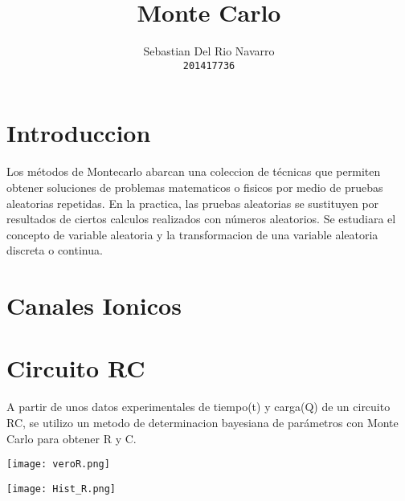 \documentclass[twoside]{article}
\title{\vspace{-15mm}\fontsize{20pt}{12pt}\selectfont\textbf{ Monte Carlo}}
\author{
  Sebastian Del Rio Navarro\\
  \texttt{201417736}\\
  }
\begin{document}
\maketitle %






\section{Introduccion}


Los métodos de Montecarlo abarcan una coleccion de técnicas que permiten obtener soluciones de problemas matematicos o fisicos por medio de pruebas aleatorias repetidas. En la practica, las pruebas aleatorias se sustituyen por resultados de ciertos calculos realizados con números aleatorios. Se estudiara el concepto de variable aleatoria y la transformacion de una variable aleatoria discreta o continua.



\section{Canales Ionicos}


\pagebreak

\section{Circuito RC}

A partir de unos datos experimentales de tiempo(t) y carga(Q) de un circuito RC, se utilizo un metodo de determinacion bayesiana de parámetros con Monte Carlo para obtener R y C.

\begin{centering}
\texttt{[image: veroR.png]}
\end{centering}

\begin{centering}
\texttt{[image: Hist\_R.png]}
\end{centering}
\end{document}
